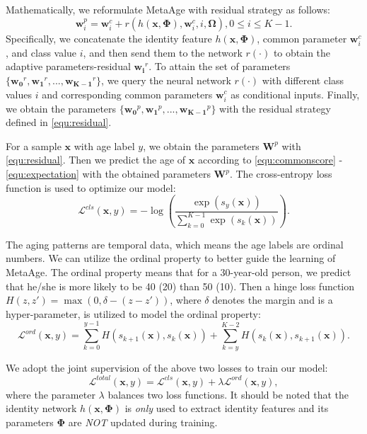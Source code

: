 \documentclass[journal,twoside]{IEEEtran}
\begin{document}
Mathematically, we reformulate MetaAge with residual strategy as follows:
\begin{equation}
  \bm{w}_i^{p} = \bm{w}_i^c + r(h(\bm{x},\bm{\Phi}),\bm{w}_i^c,i,\bm{\Omega}), 0 \leq i \leq K-1.
  \label{equ:residual}
\end{equation}
Specifically, we concatenate the identity feature $h(\bm{x},\bm{\Phi})$,  common parameter $\bm{w}_i^c$, and class value $i$, and then send them to the network $r(\cdot)$ to obtain the adaptive parameters-residual $\bm{w_i}^r$. To attain the set of parameters $\{\bm{w_0}^r,\bm{w_1}^r,...,\bm{w_{K-1}}^r\}$, we query the neural network $r(\cdot)$ with different class values $i$ and corresponding common parameters $\bm{w}_i^c$ as conditional inputs. 
Finally, we obtain the parameters $\{\bm{w_0}^p,\bm{w_1}^p,...,\bm{w_{K-1}}^p\}$ with the residual strategy defined in \eqref{equ:residual}.






For a sample $\bm{x}$ with age label $y$, we obtain the parameters $\bm{W}^{p}$ with \eqref{equ:residual}. Then we predict the age of $\bm{x}$ according to  \eqref{equ:commonscore} - \eqref{equ:expectation} with the obtained parameters $\bm{W}^{p}$. The cross-entropy loss function is used to optimize our model:
\begin{equation}
\mathcal{L}^{cls}(\bm{x},y)  = - \log(\frac{\exp(s_y(\bm{x}))}{\sum_{k=0}^{K-1} \exp(s_k(\bm{x}))}).
\label{equ:loss1}
\end{equation}

The aging patterns are temporal data, which means the age labels are ordinal numbers. We can utilize the ordinal property to better guide the learning of MetaAge. The ordinal property means that for a 30-year-old person, we predict that he/she is more likely to be 40 (20) than 50 (10).
Then a hinge loss function $H(z,z') = \max(0,\delta - (z - z'))$, where $\delta$ denotes the margin and is a hyper-parameter,
is utilized to model the ordinal property:
\begin{equation}
\mathcal{L}^{ord}(\bm{x},y) = \sum_{k=0}^{y-1}H(s_{k+1}(\bm{x}),s_{k}(\bm{x})) + \sum_{k=y}^{K-2}H(s_{k}(\bm{x}),s_{k+1}(\bm{x})).
\label{equ:loss2}
\end{equation}

We adopt the joint supervision of the above two losses to train our model:
\begin{equation}
\mathcal{L}^{total}(\bm{x},y)  = \mathcal{L}^{cls}(\bm{x},y)  + \lambda \mathcal{L}^{ord}(\bm{x},y) ,
\label{equ:loss3}
\end{equation}
where the parameter $\lambda$ balances two loss functions. It should be noted that the identity network $h(\bm{x},\bm{\Phi})$ is \emph{only} used to extract identity features and its parameters $\bm{\Phi}$ are \emph{NOT} updated during training.
\end{document}
